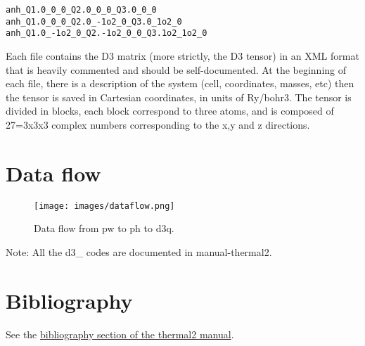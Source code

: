 \documentclass[
]{article}
\begin{document}
\begin{verbatim}
anh_Q1.0_0_0_Q2.0_0_0_Q3.0_0_0 
anh_Q1.0_0_0_Q2.0_-1o2_0_Q3.0_1o2_0 
anh_Q1.0_-1o2_0_Q2.-1o2_0_0_Q3.1o2_1o2_0
\end{verbatim}

Each file contains the D3 matrix (more strictly, the D3 tensor) in an
XML format that is heavily commented and should be self-documented. At
the beginning of each file, there is a description of the system (cell,
coordinates, masses, etc) then the tensor is saved in Cartesian
coordinates, in units of Ry/bohr3. The tensor is divided in blocks, each
block correspond to three atoms, and is composed of 27=3x3x3 complex
numbers corresponding to the x,y and z directions.

\hypertarget{data-flow}{%
\section{Data flow}\label{data-flow}}

\begin{figure}
\centering
\texttt{[image: images/dataflow.png]}
\caption{Data flow from pw to ph to d3q.}
\end{figure}

Note: All the d3\_ codes are documented in manual-thermal2.

\hypertarget{bibliography}{%
\section{Bibliography}\label{bibliography}}

See the \href{thermal2-manual.md\#bibliography}{bibliography section of
the thermal2 manual}.
\end{document}

